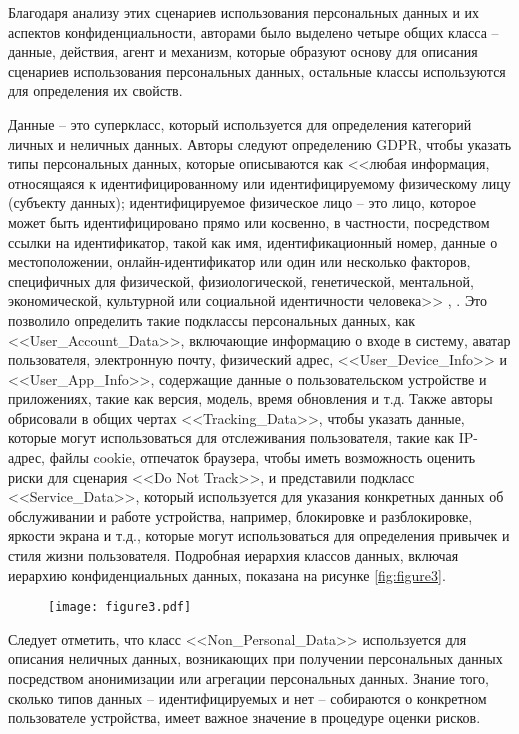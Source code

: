 \documentclass[../main]{subfiles}
\begin{document}
Благодаря анализу этих сценариев использования персональных данных и их аспектов конфиденциальности, авторами было выделено четыре общих класса -- данные, действия, агент и механизм, которые образуют основу для описания сценариев использования персональных данных, остальные классы используются для определения их свойств.

Данные -- это суперкласс, который используется для определения категорий личных и неличных данных. Авторы следуют определению GDPR, чтобы указать типы персональных данных, которые описываются как <<любая информация, относящаяся к идентифицированному или идентифицируемому физическому лицу (субъекту данных); идентифицируемое физическое лицо -- это лицо, которое может быть идентифицировано прямо или косвенно, в частности, посредством ссылки на идентификатор, такой как имя, идентификационный номер, данные о местоположении, онлайн-идентификатор или один или несколько факторов, специфичных для физической, физиологической, генетической, ментальной, экономической, культурной или социальной идентичности человека>> \cite{GDPR}, \cite{MDPI4}. Это позволило определить такие подклассы персональных данных, как <<User\_Account\_Data>>, включающие информацию о входе в систему, аватар пользователя, электронную почту, физический адрес, <<User\_Device\_Info>> и <<User\_App\_Info>>, содержащие данные о пользовательском устройстве и приложениях, такие как версия, модель, время обновления и т.д. Также авторы обрисовали в общих чертах <<Tracking\_Data>>, чтобы указать данные, которые могут использоваться для отслеживания пользователя, такие как IP-адрес, файлы cookie, отпечаток браузера, чтобы иметь возможность оценить риски для сценария <<Do Not Track>>, и представили подкласс <<Service\_Data>>, который используется для указания конкретных данных об обслуживании и работе устройства, например, блокировке и разблокировке, яркости экрана и т.д., которые могут использоваться для определения привычек и стиля жизни пользователя. Подробная иерархия классов данных, включая иерархию конфиденциальных данных, показана на рисунке \ref{fig:figure3}.

\begin{figure}[H]
    \centering
    {\texttt{[image: figure3.pdf]}}
    \vspace{-\baselineskip}
\end{figure}

Следует отметить, что класс <<Non\_Personal\_Data>> используется для описания неличных данных, возникающих при получении персональных данных посредством анонимизации или агрегации персональных данных. Знание того, сколько типов данных -- идентифицируемых и нет -- собираются о конкретном пользователе устройства, имеет важное значение в процедуре оценки рисков.
\end{document}
